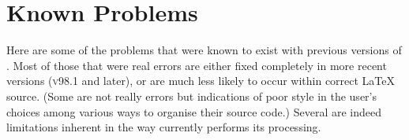 \section{Known Problems}
\label{sec:prb}%
\tableofchildlinks*\htmlrule{}\html{\\}%
\noindent
Here are some of the problems that were known to exist
with previous versions of \latextohtml. 
Most of those that were real errors are either fixed completely
in more recent versions (\textsc{v98.1} and later),
or are much less likely to occur within correct \LaTeX{} source. 
(Some are not really errors but indications of poor style
in the user's choices among
various ways to organise their source code.)\html{\\} 
Several are indeed limitations inherent in the way 
\latextohtml{} currently performs its processing.
%
